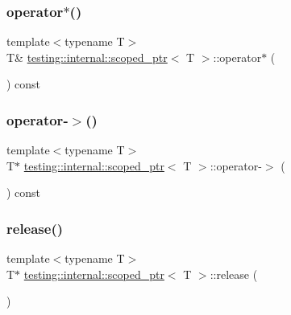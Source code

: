 \subsubsection{\texorpdfstring{operator$\ast$()}{operator*()}}
{\footnotesize\ttfamily template$<$typename T$>$ \\
T\& \hyperlink{classtesting_1_1internal_1_1scoped__ptr}{testing\+::internal\+::scoped\+\_\+ptr}$<$ T $>$\+::operator$\ast$ (\begin{DoxyParamCaption}{ }\end{DoxyParamCaption}) const\hspace{0.3cm}{\ttfamily [inline]}}

\mbox{\label{classtesting_1_1internal_1_1scoped__ptr_a2b465830a322e2c3ea420e5ccf0472f4}} 
\subsubsection{\texorpdfstring{operator-\/$>$()}{operator->()}}
{\footnotesize\ttfamily template$<$typename T$>$ \\
T$\ast$ \hyperlink{classtesting_1_1internal_1_1scoped__ptr}{testing\+::internal\+::scoped\+\_\+ptr}$<$ T $>$\+::operator-\/$>$ (\begin{DoxyParamCaption}{ }\end{DoxyParamCaption}) const\hspace{0.3cm}{\ttfamily [inline]}}

\mbox{\label{classtesting_1_1internal_1_1scoped__ptr_a7a4f3e568d81a5d8bcb5f8d6bf5130b1}} 
\subsubsection{\texorpdfstring{release()}{release()}}
{\footnotesize\ttfamily template$<$typename T$>$ \\
T$\ast$ \hyperlink{classtesting_1_1internal_1_1scoped__ptr}{testing\+::internal\+::scoped\+\_\+ptr}$<$ T $>$\+::release (\begin{DoxyParamCaption}{ }\end{DoxyParamCaption})\hspace{0.3cm}{\ttfamily [inline]}}

